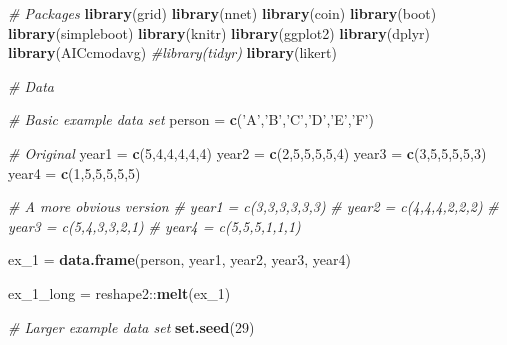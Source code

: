 \documentclass[]{book}
\newenvironment{Shaded}{\begin{snugshade}}{\end{snugshade}}
\newcommand{\KeywordTok}[1]{\textcolor[rgb]{0.13,0.29,0.53}{\textbf{{#1}}}}
\newcommand{\DecValTok}[1]{\textcolor[rgb]{0.00,0.00,0.81}{{#1}}}
\newcommand{\StringTok}[1]{\textcolor[rgb]{0.31,0.60,0.02}{{#1}}}
\newcommand{\CommentTok}[1]{\textcolor[rgb]{0.56,0.35,0.01}{\textit{{#1}}}}
\newcommand{\NormalTok}[1]{{#1}}
\begin{document}
\begin{Shaded}
\begin{Highlighting}[]
\CommentTok{# Packages}
\KeywordTok{library}\NormalTok{(grid)}
\KeywordTok{library}\NormalTok{(nnet)}
\KeywordTok{library}\NormalTok{(coin)}
\KeywordTok{library}\NormalTok{(boot)}
\KeywordTok{library}\NormalTok{(simpleboot)}
\KeywordTok{library}\NormalTok{(knitr)}
\KeywordTok{library}\NormalTok{(ggplot2)}
\KeywordTok{library}\NormalTok{(dplyr)}
\KeywordTok{library}\NormalTok{(AICcmodavg)}
\CommentTok{#library(tidyr)}
\KeywordTok{library}\NormalTok{(likert)}
 
\CommentTok{# Data}

\CommentTok{# Basic example data set}
\NormalTok{person =}\StringTok{ }\KeywordTok{c}\NormalTok{(}\StringTok{'A'}\NormalTok{,}\StringTok{'B'}\NormalTok{,}\StringTok{'C'}\NormalTok{,}\StringTok{'D'}\NormalTok{,}\StringTok{'E'}\NormalTok{,}\StringTok{'F'}\NormalTok{)}

\CommentTok{# Original }
\NormalTok{year1 =}\StringTok{ }\KeywordTok{c}\NormalTok{(}\DecValTok{5}\NormalTok{,}\DecValTok{4}\NormalTok{,}\DecValTok{4}\NormalTok{,}\DecValTok{4}\NormalTok{,}\DecValTok{4}\NormalTok{,}\DecValTok{4}\NormalTok{)}
\NormalTok{year2 =}\StringTok{ }\KeywordTok{c}\NormalTok{(}\DecValTok{2}\NormalTok{,}\DecValTok{5}\NormalTok{,}\DecValTok{5}\NormalTok{,}\DecValTok{5}\NormalTok{,}\DecValTok{5}\NormalTok{,}\DecValTok{4}\NormalTok{)}
\NormalTok{year3 =}\StringTok{ }\KeywordTok{c}\NormalTok{(}\DecValTok{3}\NormalTok{,}\DecValTok{5}\NormalTok{,}\DecValTok{5}\NormalTok{,}\DecValTok{5}\NormalTok{,}\DecValTok{5}\NormalTok{,}\DecValTok{3}\NormalTok{)}
\NormalTok{year4 =}\StringTok{ }\KeywordTok{c}\NormalTok{(}\DecValTok{1}\NormalTok{,}\DecValTok{5}\NormalTok{,}\DecValTok{5}\NormalTok{,}\DecValTok{5}\NormalTok{,}\DecValTok{5}\NormalTok{,}\DecValTok{5}\NormalTok{)}

\CommentTok{# A more obvious version}
\CommentTok{# year1 = c(3,3,3,3,3,3)}
\CommentTok{# year2 = c(4,4,4,2,2,2)}
\CommentTok{# year3 = c(5,4,3,3,2,1)}
\CommentTok{# year4 = c(5,5,5,1,1,1)}
 
\NormalTok{ex_1 =}\StringTok{ }\KeywordTok{data.frame}\NormalTok{(person, year1, year2, year3, year4)}
 
\NormalTok{ex_1_long =}\StringTok{ }\NormalTok{reshape2::}\KeywordTok{melt}\NormalTok{(ex_1)}

\CommentTok{# Larger example data set}
\KeywordTok{set.seed}\NormalTok{(}\DecValTok{29}\NormalTok{)}


\end{Highlighting}
\end{Shaded}
\end{document}
